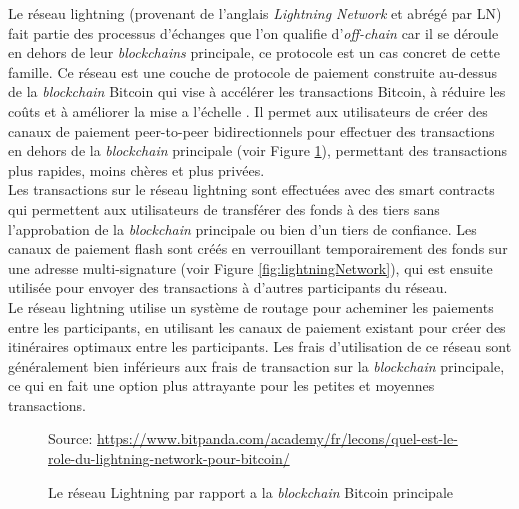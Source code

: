 Le réseau lightning (provenant de l'anglais \textit{Lightning Network} et abrégé par LN) fait partie des processus d'échanges que l'on qualifie d'\textit{off-chain} car il se déroule en dehors de leur \textit{blockchains} principale, ce protocole est un cas concret de cette famille.
Ce réseau est une couche de protocole de paiement construite au-dessus de la \textit{blockchain} Bitcoin qui vise à accélérer les transactions  Bitcoin, à réduire les coûts et à améliorer la mise a l'échelle \cite{poon2016bitcoin}.
Il permet aux utilisateurs de créer des canaux de paiement peer-to-peer bidirectionnels  pour effectuer des transactions en dehors de la \textit{blockchain} principale (voir Figure \ref{fig:lightningCouche}), permettant des transactions plus rapides, moins chères et plus privées.\\
Les transactions sur le réseau lightning sont effectuées avec des smart contracts qui permettent aux utilisateurs de transférer des fonds à des tiers sans l'approbation de la \textit{blockchain} principale ou bien d'un tiers de confiance. 
Les canaux de paiement flash sont créés en verrouillant temporairement des fonds sur une adresse multi-signature (voir Figure \ref{fig:lightningNetwork}), qui est ensuite utilisée pour envoyer des transactions à d'autres participants du réseau.\\ 
Le réseau lightning utilise un système de routage pour acheminer les paiements entre les participants, en utilisant les canaux de paiement existant pour créer des itinéraires optimaux entre les participants. 
Les frais d'utilisation de ce réseau sont généralement bien inférieurs aux frais de transaction sur la \textit{blockchain} principale, ce qui en fait une option plus attrayante pour les  petites et moyennes transactions.

\begin{figure}[h!]  
  
    \centering
    {\scriptsize Source: \url{https://www.bitpanda.com/academy/fr/lecons/quel-est-le-role-du-lightning-network-pour-bitcoin/}}
        \caption{Le réseau Lightning par rapport a la \textit{blockchain} Bitcoin principale}
        \label{fig:lightningCouche}
    \end{figure}

